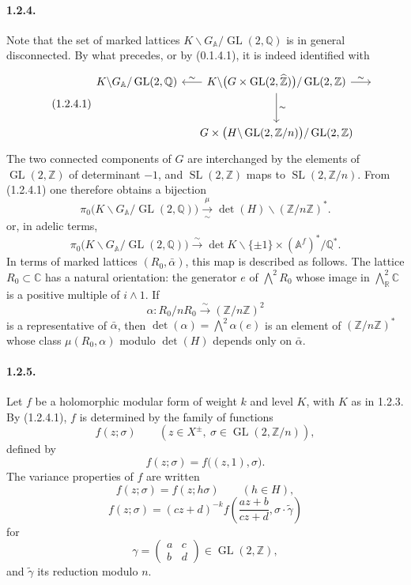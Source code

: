 \documentclass[10pt,a4paper]{article}
\providecommand{\GL}{\operatorname{GL}}
\providecommand{\SL}{\operatorname{SL}}
\providecommand{\R}{\mathbb R}
\providecommand{\Q}{\mathbb Q}
\providecommand{\Z}{\mathbb Z}
\providecommand{\C}{\mathbb C}
\providecommand{\Af}{\mathbb A^f}
\providecommand{\GA}{G_{\mathbb A}}
\providecommand{\iso}{\xrightarrow{\sim}}
\begin{document}
\paragraph{1.2.4.} Note that the set of marked lattices $K\backslash\GA/\GL(2,\Q)$ is in general disconnected. By what precedes, or by (0.1.4.1), it is indeed identified with
\[
\tag{1.2.4.1}
\begin{tikzcd}[row sep=large,column sep=small]
K\backslash\GA/\GL(2,\Q) & K\backslash\bigl(G\times\GL(2,\widehat{\Z})\bigr)/\GL(2,\Z) \arrow[l,"\sim"'] \arrow[d,"\sim"] \arrow[r,"\sim"] & {}\\
& G\times\bigl(H\backslash\GL(2,\Z/n)\bigr)/\GL(2,\Z) &
\end{tikzcd}
\]
The two connected components of $G$ are interchanged by the elements of $\GL(2,\Z)$ of determinant $-1$, and $\SL(2,\Z)$ maps to $\SL(2,\Z/n)$. From (1.2.4.1) one therefore obtains a bijection
\[
\pi_0\bigl(K\backslash\GA/\GL(2,\Q)\bigr)
\xrightarrow[\sim]{\mu}
\det(H)\backslash(\Z/n\Z)^*.
\]
or, in adelic terms,
\[
\pi_0\bigl(K\backslash\GA/\GL(2,\Q)\bigr)
\iso
\det K\backslash\{\pm1\}\times(\Af)^*/\Q^*.
\]
In terms of marked lattices $(R_0,\bar\alpha)$, this map is described as follows. The lattice $R_0\subset\C$ has a natural orientation: the generator $e$ of $\bigwedge^2R_0$ whose image in $\bigwedge^2_{\R}\C$ is a positive multiple of $i\wedge1$. If
\[
\alpha:R_0/nR_0\iso(\Z/n\Z)^2
\]
is a representative of $\bar\alpha$, then $\det(\alpha)=\bigwedge^2\alpha(e)$ is an element of $(\Z/n\Z)^*$ whose class $\mu(R_0,\alpha)$ modulo $\det(H)$ depends only on $\bar\alpha$.

\clearpage
{}
\hypertarget{authority-18}{}
\paragraph{1.2.5.} Let $f$ be a holomorphic modular form of weight $k$ and level $K$, with $K$ as in 1.2.3. By (1.2.4.1), $f$ is determined by the family of functions
\[
f(z;\sigma)\qquad(z\in X^\pm,
\ \sigma\in\GL(2,\Z/n)),
\]
defined by
\[
f(z;\sigma)=f\bigl((z,1),\sigma\bigr).
\]
The variance properties of $f$ are written
\[
\tag{1.2.5.1}
f(z;\sigma)=f(z;h\sigma)\qquad(h\in H),
\]
\[
\tag{1.2.5.2}
f(z;\sigma)=(cz+d)^{-k}
 f\left(\frac{az+b}{cz+d},\sigma\cdot\widetilde\gamma\right)
\]
for
\[
\gamma=\begin{pmatrix}a&c\\ b&d\end{pmatrix}\in\GL(2,\Z),
\]
and $\widetilde\gamma$ its reduction modulo $n$.
\end{document}
